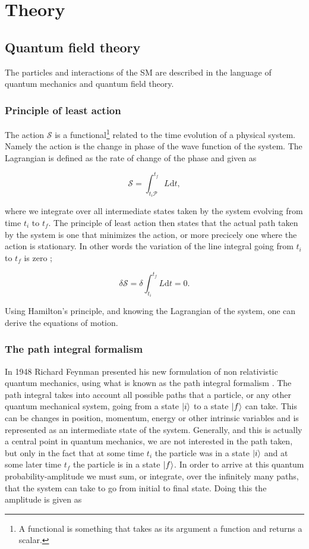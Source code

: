 \section{Theory}
\subsection{Quantum field theory}
The particles and interactions of the SM are described in the language of quantum mechanics and quantum field theory.

\subsubsection{Principle of least action}
The action $\mathcal{S}$ is a functional\footnote{A functional is something that takes as its argument a function and returns a scalar.} related to the time evolution of a physical system. Namely the action is the change in phase of the wave function of the system. The Lagrangian is defined as the rate of change of the phase and given as

\begin{equation}
	\mathcal{S} = \int_{t_i \mathcal{P}}^{t_f} L \textrm{d}t,
\end{equation}

where we integrate over all intermediate states taken by the system evolving from time $t_i$ to $t_f$. The principle of least action then states that the actual path taken by the system is one that minimizes the action, or more precicely one where the action is stationary. In other words the variation of the line integral going from $t_i$ to $t_f$ is zero \cite{goldstein1959};

\begin{equation}
	\delta \mathcal{S} = \delta \int_{t_i}^{t_f} L \textrm{d}t = 0.
\end{equation}

Using Hamilton's principle, and knowing the Lagrangian of the system, one can derive the equations of motion.

\subsubsection{The path integral formalism}
In 1948 Richard Feynman presented his new formulation of non relativistic quantum mechanics, using what is known as the path integral formalism \cite{feynman1948sta}. The path integral takes into account all possible paths that a particle, or any other quantum mechanical system, going from a state $|i \rangle$ to a state $|f \rangle$ can take. This can be changes in position, momentum, energy or other intrinsic variables and is represented as an intermediate state of the system. Generally, and this is actually a central point in quantum mechanics, we are not interested in the path taken, but only in the fact that at some time $t_{i}$ the particle was in a state $|i \rangle$ and at some later time $t_{f}$ the particle is in a state $|f \rangle$. In order to arrive at this quantum probability-amplitude we must sum, or integrate, over the infinitely many paths, that the system can take to go from initial to final state. Doing this the amplitude is given as  \cite{richter_path_integrals}

